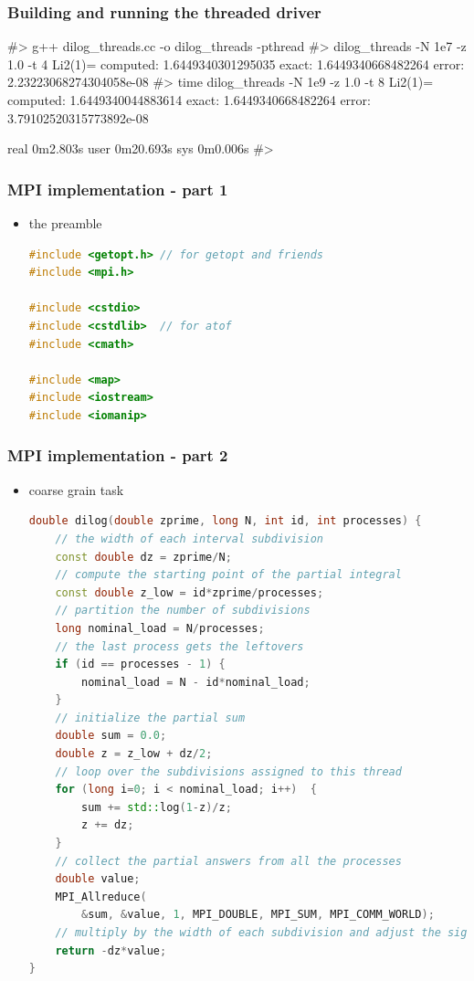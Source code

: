 \begin{frame}[fragile]
%
  \frametitle{Building and running the threaded driver}
%
  \begin{shell}{}
#> g++ dilog_threads.cc -o dilog_threads -pthread
#> dilog_threads -N 1e7 -z 1.0 -t 4
Li2(1)=
 computed: 1.6449340301295035
    exact: 1.6449340668482264
    error: 2.23223068274304058e-08
#> time dilog_threads -N 1e9 -z 1.0 -t 8
Li2(1)=
 computed: 1.6449340044883614
    exact: 1.6449340668482264
    error: 3.79102520315773892e-08

real    0m2.803s
user    0m20.693s
sys     0m0.006s
#>
  \end{shell}
%
\end{frame}

\begin{frame}[fragile]
%
  \frametitle{MPI implementation - part 1}
%
  \begin{itemize}
  \item the preamble
  \begin{lstlisting}[language=c++,name=mpi]
#include <getopt.h> // for getopt and friends
#include <mpi.h>

#include <cstdio>
#include <cstdlib>  // for atof
#include <cmath>

#include <map>
#include <iostream>
#include <iomanip>

  \end{lstlisting}
%
  \end{itemize}
%
\end{frame}

\begin{frame}[fragile]
%
  \frametitle{MPI implementation - part 2}
%
  \begin{itemize}
  \item coarse grain task
  \begin{lstlisting}[language=c++,name=mpi]
double dilog(double zprime, long N, int id, int processes) {
    // the width of each interval subdivision
    const double dz = zprime/N;
    // compute the starting point of the partial integral
    const double z_low = id*zprime/processes;
    // partition the number of subdivisions
    long nominal_load = N/processes;
    // the last process gets the leftovers
    if (id == processes - 1) {
        nominal_load = N - id*nominal_load;
    }
    // initialize the partial sum
    double sum = 0.0;
    double z = z_low + dz/2;
    // loop over the subdivisions assigned to this thread
    for (long i=0; i < nominal_load; i++)  {
        sum += std::log(1-z)/z;
        z += dz;
    }
    // collect the partial answers from all the processes
    double value;
    MPI_Allreduce(
        &sum, &value, 1, MPI_DOUBLE, MPI_SUM, MPI_COMM_WORLD);
    // multiply by the width of each subdivision and adjust the sign
    return -dz*value;
}
  \end{lstlisting}
%
  \end{itemize}
%
\end{frame}

